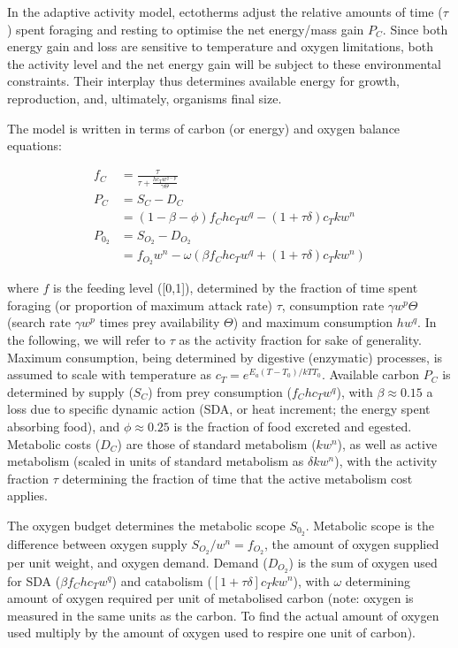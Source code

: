 \documentclass{article}\usepackage[]{graphicx}\usepackage[]{color}
\begin{document}
In the adaptive activity model, ectotherms adjust the relative amounts of time ($\tau$) spent foraging and resting to optimise the net energy/mass gain $P_C$. Since both energy gain and loss are sensitive to temperature and oxygen limitations, both the activity level and the net energy gain will be subject to these environmental constraints. Their interplay thus determines available energy for growth, reproduction, and, ultimately, organisms final size.

The model is written in terms of carbon (or energy) and oxygen balance equations:

\begin{align}
f_C &= \frac{\tau }{\tau  + \frac{h c_T w^{q-p}}{\gamma\Theta} } \label{eq:f} \\
P_C &= S_C - D_C \\
  &=(1-\beta-\phi)f_C h c_T w^q  -(1+\tau \delta)c_T k w^n \\ 
P_{0_2} &= S_{O_2} - D_{O_2} \\
        &= f_{O_2}w^n - \omega \left( \beta f_C h c_T w^q +(1+\tau \delta) c_T k w^n \right)
\end{align}


where $f$ is the feeding level ([0,1]), determined by the fraction of time spent foraging (or proportion of maximum attack rate) $\tau$, consumption rate $\gamma w^p \Theta$ (search rate $\gamma w^p$ times prey availability $\Theta$) and maximum consumption $h w^q$. In the following, we will refer to $\tau$ as the activity fraction for sake of generality. Maximum consumption, being determined by digestive (enzymatic) processes, is assumed to scale with temperature as $c_T = e^{E_a(T-T_0)/kTT_0}$. Available carbon $P_C$ is determined by supply ($S_C$) from prey consumption ($f_C h c_T w^q$), with $\beta \approx 0.15$ a loss due to specific dynamic action (SDA, or heat increment; the energy spent absorbing food), and $\phi \approx 0.25$ is the fraction of food excreted and egested. Metabolic costs ($D_C$) are those of standard metabolism ($k w^n$), as well as active metabolism (scaled in units of standard metabolism as $\delta k w^n$), with the activity fraction $\tau$ determining the fraction of time that the active metabolism cost applies.  

The oxygen budget determines the metabolic scope $S_{0_2}$. Metabolic scope is the difference between oxygen supply $S_{O_2}/w^n=f_{O_2}$, the amount of oxygen supplied per unit weight, and oxygen demand. Demand ($D_{O_2}$) is the sum of oxygen used for SDA ($\beta f_C h c_T w^q$) and catabolism ($[1+\tau \delta] c_T k w^n$), with $\omega$ determining amount of oxygen required per unit of metabolised carbon (note: oxygen is measured in the same units as the carbon. To find the actual amount of oxygen used multiply by the amount of oxygen used to respire one unit of carbon). 
\end{document}
